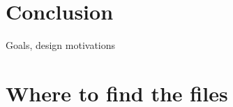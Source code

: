 \documentclass [11pt, proquest] {uwthesis}[2020/02/24]
\begin{document}

\chapter{Conclusion}

Goals, design motivations

%
%
\nocite{*}   %


%
%
\appendix
\raggedbottom\sloppy
 
 
\chapter{Where to find the files}
 
\end{document}
